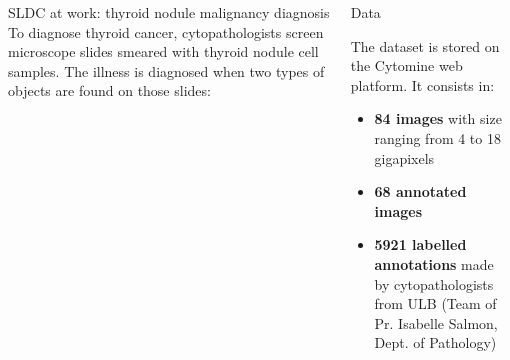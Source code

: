 \documentclass{beamer}
\begin{document}
\begin{frame}
\begin{columns}[t]
\begin{block}{SLDC at work: thyroid nodule malignancy diagnosis}
To diagnose thyroid cancer, cytopathologists screen microscope slides smeared with thyroid nodule cell samples. The illness is diagnosed when two types of objects are found on those slides: 

\begin{figure}
	\hspace{1cm}
\end{figure}
\end{block}

\begin{exampleblock}{Data}

The dataset is stored on the Cytomine \cite{maree2016collaborative} web platform. It consists in:

\begin{itemize}
	\item \textbf{84 images} with size ranging from 4 to 18 gigapixels
	\item \textbf{68 annotated images} 
	\item \textbf{5921 labelled annotations} made by cytopathologists from ULB (Team of Pr. Isabelle Salmon, Dept. of Pathology)
\end{itemize}


\end{exampleblock}
\end{columns}
\end{frame}
\end{document}
